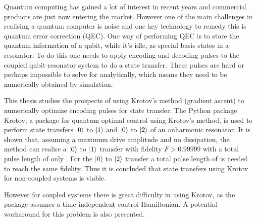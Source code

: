 \documentclass[main.tex]{subfiles}
\begin{document}
Quantum computing has gained a lot of interest in recent years and commercial products are just now entering the market.
However one of the main challenges in realising a quantum computer is noise and one key technology to remedy this is quantum error correction (QEC).
One way of performing QEC is to store the quantum information of a qubit, while it's idle, as special basis states in a resonator.
To do this one needs to apply encoding and decoding pulses to the coupled qubit-resonator system to do a state transfer.
These pulses are hard or perhaps impossible to solve for analytically, which means they need to be numerically obtained by simulation.

This thesis studies the prospects of using Krotov's method (gradient ascent) to numerically optimize encoding pulses for state transfer.
The Python package Krotov, a package for quantum optimal control using Krotov's method, is used to perform state transfers \(\ket{0}\) to \(\ket{1}\) and \(\ket{0}\) to \(\ket{2}\) of an anharmonic resonator.
It is shown that, assuming a maximum drive amplitude and no dissipation, the method can realise a \(\ket{0}\) to \(\ket{1}\) transfer with fidelity \( F > 0.99999\) with a total pulse length of only .
For the \(\ket{0}\) to \(\ket{2}\) transfer a total pulse length of  is needed to reach the same fidelity.
Thus it is concluded that state transfers using Krotov for non-coupled systems is viable.

However for coupled systems there is great difficulty in using Krotov, as the package assumes a time-independent control Hamiltonian.
A potential workaround for this problem is also presented.
\end{document}
